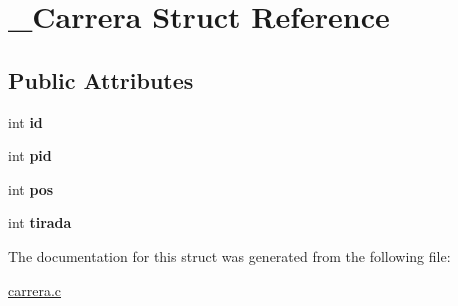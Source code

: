 \hypertarget{struct__Carrera}{}\section{\+\_\+\+Carrera Struct Reference}
\label{struct__Carrera}
\subsection*{Public Attributes}
\begin{DoxyCompactItemize}
\item 
int {\bfseries id}\hypertarget{struct__Carrera_a842fb73a7e5fd05a5c80079b67eac95b}{}\label{struct__Carrera_a842fb73a7e5fd05a5c80079b67eac95b}

\item 
int {\bfseries pid}\hypertarget{struct__Carrera_aae30a3f276a9ac25ffa42fa65736a735}{}\label{struct__Carrera_aae30a3f276a9ac25ffa42fa65736a735}

\item 
int {\bfseries pos}\hypertarget{struct__Carrera_a2c723a949d2125c8989fabf48028ba12}{}\label{struct__Carrera_a2c723a949d2125c8989fabf48028ba12}

\item 
int {\bfseries tirada}\hypertarget{struct__Carrera_ae091854540d0a874642d92c971a0f86a}{}\label{struct__Carrera_ae091854540d0a874642d92c971a0f86a}

\end{DoxyCompactItemize}


The documentation for this struct was generated from the following file\+:\begin{DoxyCompactItemize}
\item 
\hyperlink{carrera_8c}{carrera.\+c}\end{DoxyCompactItemize}
